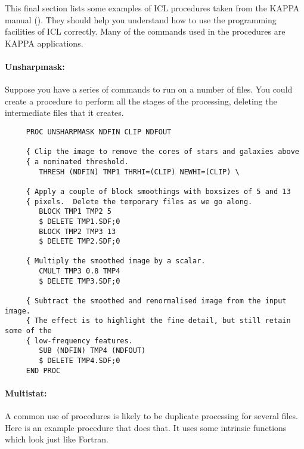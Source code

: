 This final section lists some examples of ICL procedures taken from the KAPPA
manual ().
They should help you understand how to use the programming facilities of
ICL correctly.
Many of the commands used in the procedures are KAPPA applications.

\paragraph{Unsharpmask:}\hfill

Suppose you have a series of commands to run on a number of files.
You could create a procedure to perform all the stages of the processing,
deleting the intermediate files that it creates.

\begin{small}
\begin{verbatim}
     PROC UNSHARPMASK NDFIN CLIP NDFOUT

     { Clip the image to remove the cores of stars and galaxies above
     { a nominated threshold.
        THRESH (NDFIN) TMP1 THRHI=(CLIP) NEWHI=(CLIP) \

     { Apply a couple of block smoothings with boxsizes of 5 and 13
     { pixels.  Delete the temporary files as we go along.
        BLOCK TMP1 TMP2 5
        $ DELETE TMP1.SDF;0
        BLOCK TMP2 TMP3 13
        $ DELETE TMP2.SDF;0

     { Multiply the smoothed image by a scalar.
        CMULT TMP3 0.8 TMP4
        $ DELETE TMP3.SDF;0

     { Subtract the smoothed and renormalised image from the input image.
     { The effect is to highlight the fine detail, but still retain some of the
     { low-frequency features.
        SUB (NDFIN) TMP4 (NDFOUT)
        $ DELETE TMP4.SDF;0
     END PROC
\end{verbatim}
\end{small}

\paragraph{Multistat:}\hfill

A common use of procedures is likely to be duplicate processing for several
files.
Here is an example procedure that does that.
It uses some intrinsic functions which look just like Fortran.

